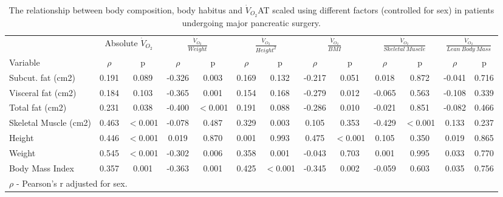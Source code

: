 \begin{sidewaystable}[p]
	\caption{The relationship between body composition, body habitus and $\dot{V}_{O_2}$AT scaled using different factors (controlled for sex) in patients undergoing major pancreatic surgery.}
	\label{table:bc_at_new_indices}
	\footnotesize
	\centering
	\renewcommand{\arraystretch}{1.5} %
	\begin{tabular}{|l|cc|cc|cc|cc|cc|cc|}
		\hline
		& \multicolumn{2}{c|}{Absolute $\dot{V}_{O_2}$} & \multicolumn{2}{c|}{$\frac{\dot{V}_{O_2}}{Weight}$} & \multicolumn{2}{c|}{$\frac{\dot{V}_{O_2}}{Height^2}$} & \multicolumn{2}{c|}{$\frac{\dot{V}_{O_2}}{BMI}$} & \multicolumn{2}{c|}{$\frac{\dot{V}_{O_2}}{Skeletal\ Muscle}$}  & \multicolumn{2}{c|}{$\frac{\dot{V}_{O_2}}{Lean\ Body\ Mass}$}\\
		
		Variable              & $\rho$ &    p     & $\rho$ &    p     & $\rho$ &    p     & $\rho$ &    p     & $\rho$ &    p    & $\rho$ &    p \\ \hline
		Subcut. fat (cm2)     & 0.191  &  0.089   & -0.326 &  0.003   & 0.169  &  0.132   & -0.217 &  0.051   & 0.018  &  0.872  & -0.041 & 0.716 \\
		Visceral fat (cm2)    & 0.184  &  0.103   & -0.365 &  0.001   & 0.154  &  0.168   & -0.279 &  0.012   & -0.065 &  0.563   & -0.108 & 0.339\\
		Total fat (cm2)       & 0.231  &  0.038   & -0.400 & $<$0.001 & 0.191  &  0.088   & -0.286 &  0.010   & -0.021 &  0.851   & -0.082 & 0.466\\
		Skeletal Muscle (cm2) & 0.463  & $<$0.001 & -0.078 &  0.487   & 0.329  &  0.003   & 0.105  &  0.353   & -0.429 & $<$0.001 & 0.133 & 0.237 \\
		Height                & 0.446  & $<$0.001 & 0.019  &  0.870   & 0.001  &  0.993   & 0.475  & $<$0.001 & 0.105  &  0.350   & 0.019 & 0.865\\
		Weight                & 0.545  & $<$0.001 & -0.302 &  0.006   & 0.358  &  0.001   & -0.043 &  0.703   & 0.001  &  0.995   & 0.033 & 0.770\\
		Body Mass Index       & 0.357  &  0.001   & -0.363 &  0.001   & 0.425  & $<$0.001 & -0.345 &  0.002   & -0.059 &  0.603   & 0.035 & 0.756\\ \hline
		\multicolumn{11}{l}{$\rho$ - Pearson's r adjusted for sex.}
	\end{tabular}
\end{sidewaystable}


